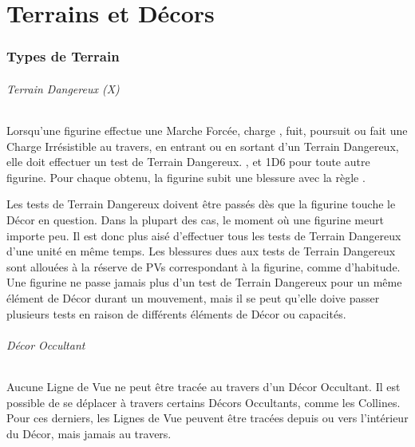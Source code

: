 
\part{Terrains et Décors}

\section{Types de Terrain}

\paragraph{Terrain Dangereux (X)}

Lorsqu'une figurine effectue une Marche Forcée, charge , fuit, poursuit ou fait une Charge Irrésistible au travers, en entrant ou en sortant d'un Terrain Dangereux, elle doit effectuer un test de Terrain Dangereux. , et 1D6 pour toute autre figurine. Pour chaque  obtenu, la figurine subit une blessure avec la règle .


Les tests de Terrain Dangereux doivent être passés dès que la figurine touche le Décor en question. Dans la plupart des cas, le moment où une figurine meurt importe peu. Il est donc plus aisé d'effectuer tous les tests de Terrain Dangereux d'une unité en même temps. Les blessures dues aux tests de Terrain Dangereux sont allouées à la réserve de PVs correspondant à la figurine, comme d'habitude. Une figurine ne passe jamais plus d'un test de Terrain Dangereux pour un même élément de Décor durant un mouvement, mais il se peut qu'elle doive passer plusieurs tests en raison de différents éléments de Décor ou capacités.

\paragraph{Décor Occultant}

Aucune Ligne de Vue ne peut être tracée au travers d'un Décor Occultant. Il est possible de se déplacer à travers certains Décors Occultants, comme les Collines. Pour ces derniers, les Lignes de Vue peuvent être tracées depuis ou vers l'intérieur du Décor, mais jamais au travers. 

